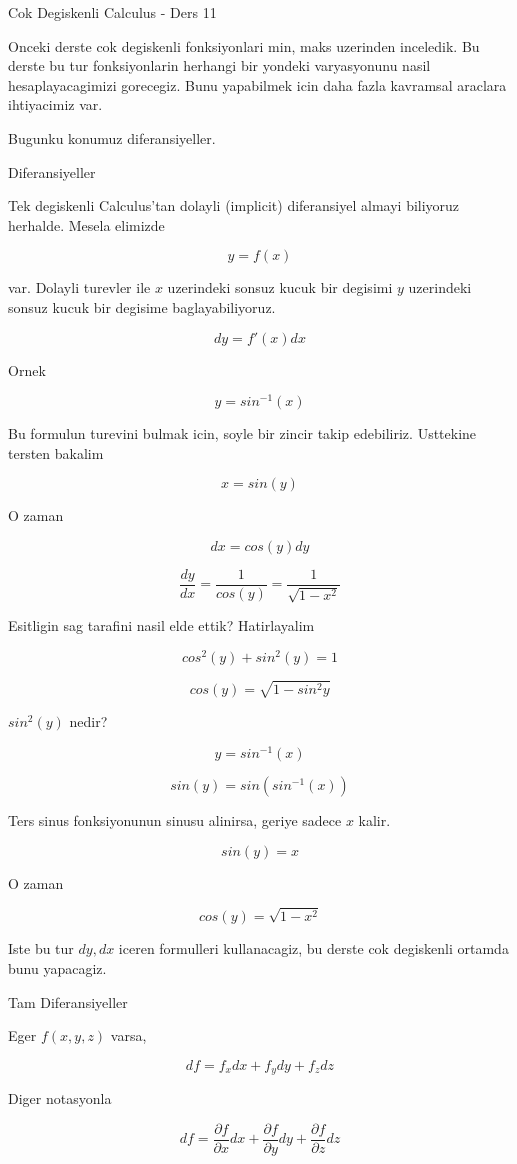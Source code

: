 \documentclass[12pt,fleqn]{article}
\begin{document}
Cok Degiskenli Calculus - Ders 11

Onceki derste cok degiskenli fonksiyonlari min, maks uzerinden
inceledik. Bu derste bu tur fonksiyonlarin herhangi bir yondeki
varyasyonunu nasil hesaplayacagimizi gorecegiz. Bunu yapabilmek icin daha
fazla kavramsal araclara ihtiyacimiz var. 

Bugunku konumuz diferansiyeller. 

Diferansiyeller

Tek degiskenli Calculus'tan dolayli (implicit) diferansiyel almayi
biliyoruz herhalde. Mesela elimizde

\[ y = f(x) \]

var. Dolayli turevler ile $x$ uzerindeki sonsuz kucuk bir degisimi $y$
uzerindeki sonsuz kucuk bir degisime baglayabiliyoruz. 

\[ dy = f'(x) dx \]

Ornek

\[ y = sin^{-1}(x) \]

Bu formulun turevini bulmak icin, soyle bir zincir takip
edebiliriz. Usttekine tersten bakalim

\[ x = sin(y) \]

O zaman

\[ dx = cos(y)dy \]

\[ 
\frac{dy}{dx} = \frac{1}{cos(y)} = \frac{1}{\sqrt{1-x^2}}
 \]

Esitligin sag tarafini nasil elde ettik? Hatirlayalim

\[ cos^2(y) + sin^2(y) = 1 \]

\[ cos (y) = \sqrt{1 - sin^2y} \]

$sin^2(y)$ nedir? 

\[ y = sin^{-1}(x) \]

\[ sin(y) = sin(sin^{-1}(x)) \]

Ters sinus fonksiyonunun sinusu alinirsa, geriye sadece $x$ kalir. 

\[ sin(y) = x \]

O zaman

\[ cos (y) = \sqrt{1 - x^2} \]

Iste bu tur $dy,dx$ iceren formulleri kullanacagiz, bu derste cok
degiskenli ortamda bunu yapacagiz. 

Tam Diferansiyeller

Eger $f(x,y,z)$ varsa, 

\[ df = f_xdx + f_ydy + f_zdz \]

Diger notasyonla

\[ df = \frac{\partial f}{\partial x}dx + \frac{\partial f}{\partial y}dy + 
\frac{\partial f}{\partial z}dz \]
\end{document}

